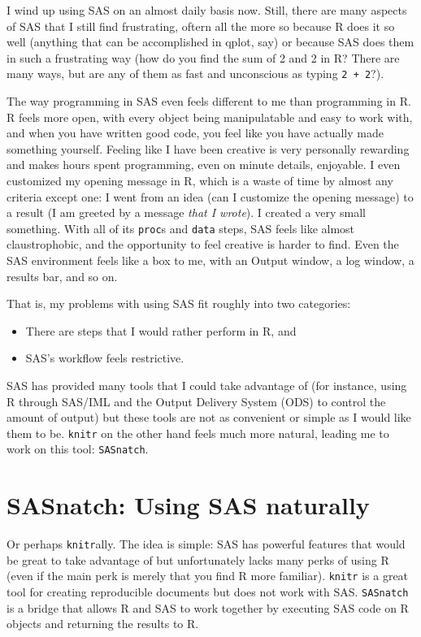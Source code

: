 \documentclass[10pt]{report}
\begin{document}
I wind up using SAS on an almost daily basis now. 
Still, there are many aspects of SAS that I still find frustrating,
oftern all the more so because R does it so well (anything that
can be accomplished in qplot, say)
or because SAS does them in such a frustrating way (how do you find the sum of 2 and 2 in R? There are many ways, but 
are any of them as fast and unconscious as typing \verb!2 + 2!?). 

The way programming in SAS even feels different to me than programming in R.
R feels more open, with every object being manipulatable and easy to work with,
and when you have written good code, you feel like you have actually 
made something yourself. Feeling like I have been creative is very personally
rewarding and makes hours spent programming, even on minute details, enjoyable.
I even customized my opening message in R, which is a waste of time by almost any
criteria except one: I went from an idea (can I customize the opening message) to a result
(I am greeted by a message \textit{that I wrote}). I created a very small something.
With all of its \verb!proc!s and \verb!data! steps, SAS feels like almost claustrophobic, 
and the opportunity to feel creative is harder to find. 
Even the SAS environment feels like a box to me, with an Output window, a log window,
a results bar, and so on. 

That is, my problems with using SAS fit roughly into two categories:

\begin{itemize}
   \item There are steps that I would rather perform in R, and
   \item SAS's workflow feels restrictive.
\end{itemize}

SAS has provided many tools that I could take advantage of (for instance, using R through SAS/IML 
and the Output Delivery System (ODS) to control the amount of output) but
these tools are not as convenient or simple as I would like them to be.
\verb!knitr! on the other hand feels much more natural, leading me to work on this 
tool: \verb!SASnatch!.

\section{SASnatch: Using SAS naturally}
Or perhaps \verb!knitr!ally. 
The idea is simple: SAS has powerful 
features that would be great to take advantage of but
unfortunately lacks many perks of using R (even if the main 
perk is merely that you find R more familiar). 
\verb!knitr! is a great tool for creating reproducible documents but does not work with SAS.
\verb!SASnatch! is a bridge that allows R and SAS to work together by executing SAS code 
on R objects and returning the results to R. 
\end{document}
